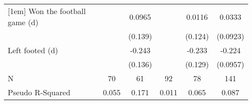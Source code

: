 {\begin{tabular}{l*{5}{c}}
[1em]
Won the football game (d)&                     &      0.0965         &                     &      0.0116         &      0.0333         \\
                    &                     &     (0.139)         &                     &     (0.124)         &    (0.0923)         \\
[1em]
Left footed (d)     &                     &      -0.243\sym{*}  &                     &      -0.233\sym{*}  &      -0.224\sym{**} \\
                    &                     &     (0.136)         &                     &     (0.129)         &    (0.0957)         \\
\hline
N                   &          70         &          61         &          92         &          78         &         141         \\
Pseudo R-Squared    &       0.055         &       0.171         &       0.011         &       0.065         &       0.087         \\
\hline\hline
\end{tabular}
}
